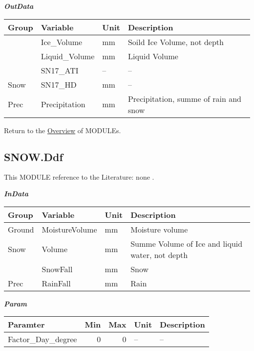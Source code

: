 \documentclass[
]{book}
\begin{document}
\textbf{\emph{OutData}}

\begin{table}[!h]
\centering
\begin{tabular}{l|l|l|l}
\hline
Group & Variable & Unit & Description\\
\hline
 & Ice\_Volume & mm & Soild Ice Volume, not depth\\
\cline{2-4}
 & Liquid\_Volume & mm & Liquid Volume\\
\cline{2-4}
 & SN17\_ATI & -- & --\\
\cline{2-4}
\multirow{-4}{*}{\raggedright\arraybackslash Snow} & SN17\_HD & mm & --\\
\cline{1-4}
Prec & Precipitation & mm & Precipitation, summe of rain and snow\\
\hline
\end{tabular}
\end{table}

Return to the \protect\hyperlink{module}{Overview} of MODULEs.

\hypertarget{SNOW.Ddf}{%
\subsection{SNOW.Ddf}\label{SNOW.Ddf}}

This MODULE reference to the Literature: none \citep{none}.

\textbf{\emph{InData}}

\begin{table}[!h]
\centering
\begin{tabular}{l|l|l|l}
\hline
Group & Variable & Unit & Description\\
\hline
Ground & MoistureVolume & mm & Moisture volume\\
\cline{1-4}
Snow & Volume & mm & Summe Volume of Ice and liquid water, not depth\\
\cline{1-4}
 & SnowFall & mm & Snow\\
\cline{2-4}
\multirow{-2}{*}{\raggedright\arraybackslash Prec} & RainFall & mm & Rain\\
\hline
\end{tabular}
\end{table}

\textbf{\emph{Param}}

\begin{table}[!h]
\centering
\begin{tabular}{l|r|r|l|l}
\hline
Paramter & Min & Max & Unit & Description\\
\hline
Factor\_Day\_degree & 0 & 0 & -- & --\\
\hline
\end{tabular}
\end{table}
\end{document}
